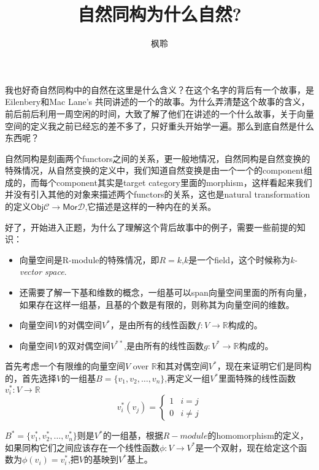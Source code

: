 \documentclass[UTF8,11pt,a4paper]{ctexart}%
\begin{document}
\newcommand*{\xfunc}[4]{{#2}\colon{#3}{#1}{#4}}
\newcommand*{\func}[3]{\xfunc{\to}{#1}{#2}{#3}}
 
\title{自然同构为什么自然?}
\author{枫聆}
\maketitle

我也好奇自然同构中的自然在这里是什么含义？在这个名字的背后有一个故事，是Eilenbery和Mac Lane's 共同讲述的一个的故事。为什么弄清楚这个故事的含义，前后前后利用一周空闲的时间，大致了解了他们在讲述的一个什么故事，关于向量空间的定义我之前已经忘的差不多了，只好重头开始学一遍。那么到底自然是什么东西呢？

自然同构是刻画两个functors之间的关系，更一般地情况，自然同构是自然变换的特殊情况，从自然变换的定义中，我们知道自然变换是由一个一个的component组成的，而每个component其实是target category里面的morphism，这样看起来我们并没有引入其他的对象来描述两个functors的关系，这也是natural transformation的定义$\textsf{Obj}\mathcal{C} \rightarrow \textsf{Mor}\mathcal{D}$,它描述是这样的一种内在的关系。

好了，开始进入正题，为什么了理解这个背后故事中的例子，需要一些前提的知识：

\begin{itemize}
	\item 向量空间是R-module的特殊情况，即$R=k$,$k$是一个field，这个时候称为\textsl{k-vector space}.
	\item 还需要了解一下基和维数的概念，一组基可以span向量空间里面的所有向量，如果存在这样一组基，且基的个数是有限的，则称其为向量空间的维数。
	\item 向量空间$V$的对偶空间$V^{*}$，是由所有的线性函数$\func{f}{V}{\mathbb{R}}$构成的。
	\item 向量空间$V$的双对偶空间$V^{**}$,是由所有的线性函数$\func{g}{V^{*}}{\mathbb{R}}$构成的。
	
\end{itemize}

首先考虑一个有限维的向量空间$V$ over $\mathbb{R}$和其对偶空间$V^{*}$，现在来证明它们是同构的，首先选择$V$的一组基$B=\{v_1,v_2,\ldots,v_n\}$,再定义一组$V^{*}$里面特殊的线性函数$\func{v_i^{*}}{V}{\mathbb{R}}$ 
	\[v_i^{*}(v_j)=\left\{ 
	\begin{array}{rcl}
	1 & i=j \\
	0 & i\neq j
	\end{array}
	\right.
	\]
	
$B^{*}=\{v_1^{*},v_2^{*},\ldots,v_n^{*}\}$则是$V^{*}$的一组基，根据$R-module$的homomorphism的定义，如果同构它们之间应该存在一个线性函数$\func{\phi}{V}{V^{*}}$是一个双射，现在给定这个函数为$\phi(v_i)=v_i^{*}$,把$V$的基映到$V^{*}$基上。
\end{document}
